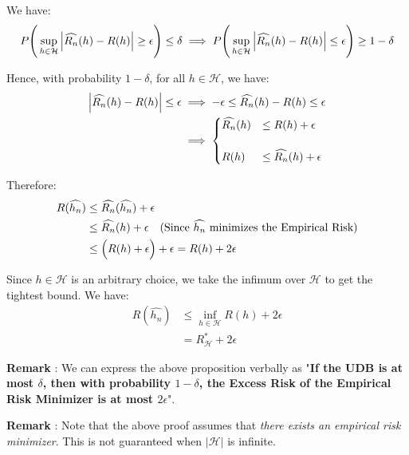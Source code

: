 \begin{proof*}
    We have:
    \begin{align*}
        P\Bigg( 
            \sup_{h\in\mathcal{H}}\Big| \widehat{R_n}(h) - R(h) \Big| \ge \epsilon
         \Bigg) \le \delta \implies 
        P\Bigg( 
            \sup_{h\in\mathcal{H}}\Big| \widehat{R_n}(h) - R(h) \Big| \le \epsilon
         \Bigg) \ge 1 - \delta
    \end{align*}

    \noindent Hence, with probability $1-\delta$, for all $h\in\mathcal{H}$, we have:
    \begin{align*}
        \Big| \widehat{R_n}(h) - R(h) \Big| \le \epsilon &\implies -\epsilon \le \widehat{R_n}(h) - R(h) \le \epsilon \\
        &\implies \begin{cases}
            \widehat{R_n}(h) &\le R(h) + \epsilon 
            \\ \\
            R(h) &\le \widehat{R_n}(h) + \epsilon
        \end{cases}
    \end{align*}

    Therefore:
    \begin{align*}
        R(\widehat{h_n}) &\le \widehat{R_n}(\widehat{h_n}) + \epsilon \\
            &\le \widehat{R_n}(h) + \epsilon \ \ \ \text{(Since $\widehat{h_n}$ minimizes the Empirical Risk)} \\
            &\le \Big( R(h) + \epsilon \Big) + \epsilon = R(h) + 2\epsilon
    \end{align*}

    \noindent Since $h\in\mathcal{H}$ is an arbitrary choice, we take the infimum over $\mathcal{H}$ to get the tightest bound. We have:
    \begin{align*}
        R(\widehat{h_n}) &\le \inf_{h\in\mathcal{H}} R(h) + 2\epsilon \\
            &= R_\mathcal{H}^* + 2\epsilon
    \end{align*}
\end{proof*}

\noindent \textbf{Remark} : We can express the above proposition verbally as "\textbf{If the UDB is at most $\delta$, then with probability $1-\delta$, the Excess Risk of the Empirical Risk Minimizer is at most $2\epsilon$}". 

\noindent \textbf{Remark} : Note that the above proof assumes that \textit{there exists an empirical risk minimizer}. This is not guaranteed when $|\mathcal{H}|$ is infinite.

